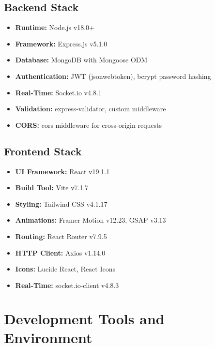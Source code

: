 \documentclass[12pt,a4paper]{report}
\begin{document}
\subsection{Backend Stack}
\begin{itemize}[left=0pt]
  \item \textbf{Runtime:} Node.js v18.0+
  \item \textbf{Framework:} Express.js v5.1.0
  \item \textbf{Database:} MongoDB with Mongoose ODM
  \item \textbf{Authentication:} JWT (jsonwebtoken), bcrypt password hashing
  \item \textbf{Real-Time:} Socket.io v4.8.1
  \item \textbf{Validation:} express-validator, custom middleware
  \item \textbf{CORS:} cors middleware for cross-origin requests
\end{itemize}

\subsection{Frontend Stack}
\begin{itemize}[left=0pt]
  \item \textbf{UI Framework:} React v19.1.1
  \item \textbf{Build Tool:} Vite v7.1.7
  \item \textbf{Styling:} Tailwind CSS v4.1.17
  \item \textbf{Animations:} Framer Motion v12.23, GSAP v3.13
  \item \textbf{Routing:} React Router v7.9.5
  \item \textbf{HTTP Client:} Axios v1.14.0
  \item \textbf{Icons:} Lucide React, React Icons
  \item \textbf{Real-Time:} socket.io-client v4.8.3
\end{itemize}

\section{Development Tools and Environment}
\end{document}
